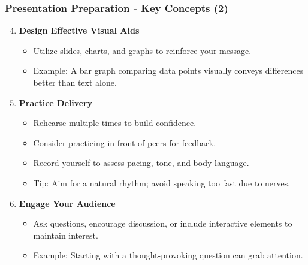 \documentclass{beamer}
\begin{document}
\begin{frame}[fragile]
    \frametitle{Presentation Preparation - Key Concepts (2)}
    \begin{enumerate}
        \setcounter{enumi}{3} %
        \item \textbf{Design Effective Visual Aids}
            \begin{itemize}
                \item Utilize slides, charts, and graphs to reinforce your message.
                \item Example: A bar graph comparing data points visually conveys differences better than text alone.
            \end{itemize}
        
        \item \textbf{Practice Delivery}
            \begin{itemize}
                \item Rehearse multiple times to build confidence. 
                \item Consider practicing in front of peers for feedback.
                \item Record yourself to assess pacing, tone, and body language.
                \item Tip: Aim for a natural rhythm; avoid speaking too fast due to nerves.
            \end{itemize}
        
        \item \textbf{Engage Your Audience}
            \begin{itemize}
                \item Ask questions, encourage discussion, or include interactive elements to maintain interest.
                \item Example: Starting with a thought-provoking question can grab attention.
            \end{itemize}
    \end{enumerate}
\end{frame}
\end{document}
